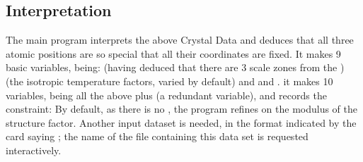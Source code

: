 \subsection{Interpretation}
% 
The main program  interprets the above Crystal Data and deduces
that all three atomic positions are so special that all their
coordinates are fixed.  It makes 9 basic variables, being:
\ssp 
{} (having deduced that there are 3 scale
zones from the )  (the isotropic
temperature factors, varied by default) and  and .
\p 
it makes 10 variables, being all the above plus  (a redundant
variable), and records the constraint:
\ssp 
{}
\ssk 
By default, as there is no , the program refines on the
modulus of the structure factor.  Another input dataset is needed, in the
format indicated by the card saying ;
  the name of the file containing
this data set is requested interactively.
% 
